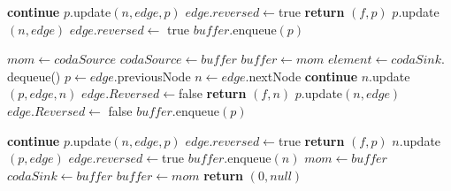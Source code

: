 \documentclass{article}
\begin{document}
\begin{algorithm}
    \begin{algorithmic}[1]
        \STATE \textbf{continue}
        \ELSE
        \STATE $p.$update$(n,edge,p)$
        \STATE $edge.reversed \leftarrow $true
        \STATE \textbf{return} $(f,p)$
        \ENDIF
        \ENDIF
        \STATE $p.$update$(n,edge)$
        \STATE $edge.reversed \leftarrow$ true
        \STATE $buffer.$enqueue$(p)$
        \ENDIF

        \ENDFOR
        \ENDWHILE
        \STATE $mom \leftarrow codaSource$
        \STATE $codaSource \leftarrow buffer$
        \STATE $buffer \leftarrow mom$
        \STATE $element \leftarrow codaSink.$dequeue()
        \STATE $p \leftarrow edge$.previousNode
        \STATE $n \leftarrow edge.$nextNode
        \STATE \textbf{continue}
        \ELSE
        \STATE $n.$update$(p,edge,n)$
        \STATE $edge.Reversed \leftarrow $false
        \STATE \textbf{return} $(f,n)$
        \ENDIF
        \ENDIF
        \STATE $p.$update$(n,edge)$
        \STATE $edge.Reversed \leftarrow$ false
        \STATE $buffer.$enqueue$(p)$
        \ENDIF
    \end{algorithmic}
\end{algorithm}
\newpage
\begin{algorithm}
    \begin{algorithmic}[1]
        \STATE \textbf{continue}
        \ELSE
        \STATE $p$.update$(n,edge,p)$
        \STATE $edge.reversed \leftarrow $true
        \STATE \textbf{return} $(f,p)$
        \ENDIF
        \ENDIF
        \STATE $n.$update$(p,edge)$
        \STATE $edge.reversed \leftarrow $true
        \STATE $buffer.$enqueue$(n)$
        \ENDIF
        \ENDFOR
        \ENDWHILE
        \STATE $mom \leftarrow buffer$
        \STATE $codaSink \leftarrow buffer$
        \STATE $buffer \leftarrow mom$
        \ENDWHILE
        \STATE \textbf{return} $(0,null)$
    \end{algorithmic}
\end{algorithm}
\end{document}
